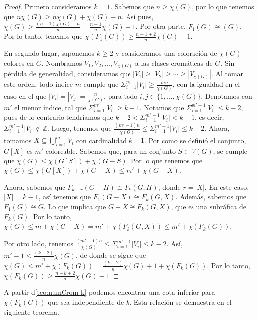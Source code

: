 \begin{proof}
    Primero consideramos $k=1$. Sabemos que $n \geq \chi(G)$, por lo que tenemos
    que $n\chi(G) \geq n\chi(G) + \chi(G) -n$. As\'i pues, $\chi (G) \geq
    \frac{(n+1)\chi(G)-n}{n} = \frac{n+1}{n}\chi (G) -1$. Por otra parte,
    $F_1(G) \cong (G)$. Por lo tanto, tenemos que $\chi(F_1(G)) \geq
    \frac{n-1+2}{n} \chi(G) -1$.
        
    En segundo lugar, suponemos $k \geq 2$ y consideramos una coloraci\'on de
    $\chi(G)$ colores en $G$. Nombramos $V_1, V_2, \dots, V_{\chi(G)}$ a las
    clases crom\'aticas de $G$. Sin p\'erdida de generalidad, consideramos que
    $|V_1|\geq |V_2|\geq \cdots \geq |V_{\chi(G)}|$. Al tomar este orden, todo
    \'indice $m$ cumple que $\Sigma_{i=1}^{m}|V_i| \geq \frac{mn}{\chi(G)}$, con
    la igualdad en el caso en el que $|V_i| = |V_j| = \frac{n}{\chi(G)}$, para
    todo $i,j \in \{1, \dots, \chi(G)\}$. Denotamos con $m'$ el menor \'indice,
    tal que $\Sigma_{i=1}^{m'}|V_i| \geq k-1$. Notamos que
    $\Sigma_{i=1}^{m'-1}|V_i| \leq k-2$, pues de lo contrario tendr\'iamos que
    $k-2<\Sigma_{i=1}^{m'-1}|V_i| < k-1$, es decir, $\Sigma_{i=1}^{m'-1}|V_i|
    \notin \mathbb{Z}$. Luego, tenemos que $\frac{(m'-1)n}{\chi(G)}\leq
    \Sigma_{i=1}^{m'-1}|V_i| \leq k-2$. Ahora, tomamos $X \subseteq
    \bigcup_{i=1}^{m'} V_i$ con cardinalidad $k-1$. Por como se defini\'o el
    conjunto, $G[X]$ es $m'$-coloreable. Sabemos que, para un conjunto $S
    \subset V(G)$, se cumple que $\chi(G) \leq \chi(G[S])+\chi(G-S)$. Por lo que
    tenemos que $\chi(G) \leq \chi(G[X])+\chi(G-X) \leq m' + \chi(G-X)$.

    Ahora, sabemos que $F_{k-r}(G-H) \cong F_k(G,H)$, donde $r = |X|$. En este
    caso, $|X| = k-1$, as\'i tenemos que $F_1(G-X) \cong F_k(G,X)$. Adem\'as,
    sabemos que $F_1(G) \cong G$. Lo que implica que $G-X \cong F_k(G,X)$, que
    es una subr\'afica de $F_k(G)$. Por lo tanto, $\chi(G) \leq m + \chi(G-X) =
    m' + \chi(F_k(G,X)) \leq m' + \chi(F_k(G))$. 
            
    Por otro lado, tenemos $\frac{(m'-1)n}{\chi(G)}\leq \Sigma_{i=1}^{m'-1}|V_i|
    \leq k-2$. As\'i, $m'-1 \leq \frac{(k-2)}{n}\chi(G)$, de donde se sigue que
    $\chi(G) \leq m' + \chi(F_k(G)) = \frac{(k-2)}{n}\chi(G) +1 + \chi(F_k(G))$.
    Por lo tanto, $\chi(F_k(G)) \geq \frac{n-k+2}{n} \chi(G) -1$
\end{proof}

A partir d\cref{teo:numCrom-k} podemos encontrar una cota inferior para
$\chi(F_k(G))$ que sea independiente de $k$. Esta relaci\'on se demuestra en el
siguiente teorema.

